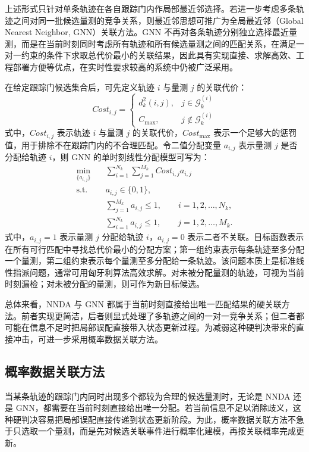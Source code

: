 \documentclass{xdupgthesis}
\begin{document}
上述形式只针对单条轨迹在各自跟踪门内作局部最近邻选择。若进一步考虑多条轨迹之间对同一批候选量测的竞争关系，则最近邻思想可推广为全局最近邻（Global Nearest Neighbor, GNN）关联方法。GNN 不再对各条轨迹分别独立选择最近量测，而是在当前时刻同时考虑所有轨迹和所有候选量测之间的匹配关系，在满足一对一约束的条件下求取总代价最小的关联结果，因此具有实现直接、求解高效、工程部署方便等优点，在实时性要求较高的系统中仍被广泛采用\cite{kuhn1955hungarian,wang2022improvedgnn}。

在给定跟踪门候选集合后，可先定义轨迹 $i$ 与量测 $j$ 的关联代价：
\begin{equation}
	Cost_{i,j}
	=
	\begin{cases}
		d_k^2(i,j), & j\in\mathcal{G}^{(i)}_k\\
		C_{\max}, & j\notin\mathcal{G}^{(i)}_k
	\end{cases}
\end{equation}
式中，$Cost_{i,j}$ 表示轨迹 $i$ 与量测 $j$ 的关联代价，$Cost_{\max}$ 表示一个足够大的惩罚值，用于排除不在跟踪门内的不合理匹配。令二值分配变量 $a_{i,j}$ 表示量测 $j$ 是否分配给轨迹 $i$，则 GNN 的单时刻线性分配模型可写为：
\begin{align}
	\min_{\{a_{i,j}\}}\quad
	& \sum_{i=1}^{N_k}\sum_{j=1}^{M_k} Cost_{i,j}a_{i,j} \\
	\text{s.t.}\quad
	& a_{i,j}\in\{0,1\}, \\
	& \sum_{j=1}^{M_k} a_{i,j}\le 1,\qquad i=1,2,\ldots,N_k, \\
	& \sum_{i=1}^{N_k} a_{i,j}\le 1,\qquad j=1,2,\ldots,M_k.
\end{align}
式中，$a_{i,j}=1$ 表示量测 $j$ 分配给轨迹 $i$，$a_{i,j}=0$ 表示二者不关联。目标函数表示在所有可行匹配中寻找总代价最小的分配方案；第一组约束表示每条轨迹至多分配一个量测，第二组约束表示每个量测至多分配给一条轨迹。该问题本质上是标准线性指派问题，通常可用匈牙利算法高效求解。对未被分配量测的轨迹，可视为当前时刻漏检；对未被分配的量测，则可作为新目标候选。

总体来看，NNDA 与 GNN 都属于当前时刻直接给出唯一匹配结果的硬关联方法。前者实现更简洁，后者则显式处理了多轨迹之间的一对一竞争关系；但二者都可能在信息不足时把局部误配直接带入状态更新过程。为减弱这种硬判决带来的直接冲击，可进一步采用概率数据关联方法。

\subsection{概率数据关联方法}

当某条轨迹的跟踪门内同时出现多个都较为合理的候选量测时，无论是 NNDA 还是 GNN，都需要在当前时刻直接给出唯一分配。若当前信息不足以消除歧义，这种硬判决容易把局部误配直接传递到状态更新阶段。为此，概率数据关联方法不急于只选取一个量测，而是先对候选关联事件进行概率化建模，再按关联概率完成更新。
\end{document}
